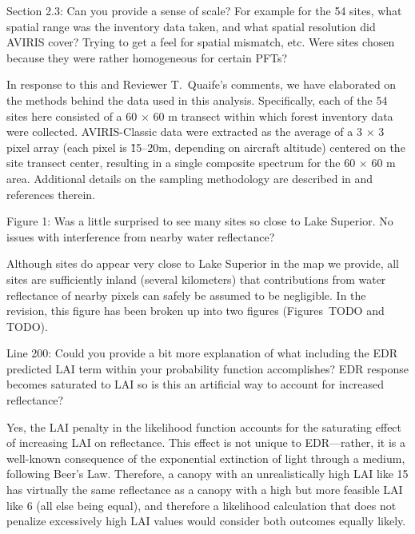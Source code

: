 \begin{reviewer}
  Section 2.3: Can you provide a sense of scale? For example for the 54 sites, what spatial range was the inventory data taken, and what spatial resolution did AVIRIS cover? Trying to get a feel for spatial mismatch, etc. Were sites chosen because they were rather homogeneous for certain PFTs?
\end{reviewer}

In response to this and Reviewer T.\ Quaife’s comments, we have elaborated on the methods behind the data used in this analysis.
Specifically, each of the 54 sites here consisted of a 60 $\times$ 60 m transect within which forest inventory data were collected.
AVIRIS-Classic data were extracted as the average of a 3 $\times$ 3 pixel array (each pixel is \~15--20m, depending on aircraft altitude) centered on the site transect center, resulting in a single composite spectrum for the 60 $\times$ 60 m area.
Additional details on the sampling methodology are described in \citet{singh2015imaging} and references therein.

\begin{reviewer}
  Figure 1: Was a little surprised to see many sites so close to Lake Superior. No issues with interference from nearby water reflectance?
\end{reviewer}

Although sites do appear very close to Lake Superior in the map we provide, all sites are sufficiently inland (several kilometers) that contributions from water reflectance of nearby pixels can safely be assumed to be negligible.
In the revision, this figure has been broken up into two figures (Figures~TODO and TODO).

\begin{reviewer}
  Line 200: Could you provide a bit more explanation of what including the EDR predicted LAI term within your probability function accomplishes? EDR response becomes saturated to LAI so is this an artificial way to account for increased reflectance?
\end{reviewer}

Yes, the LAI penalty in the likelihood function accounts for the saturating effect of increasing LAI on reflectance.
This effect is not unique to EDR---rather, it is a well-known consequence of the exponential extinction of light through a medium, following Beer’s Law.
Therefore, a canopy with an unrealistically high LAI like 15 has virtually the same reflectance as a canopy with a high but more feasible LAI like 6 (all else being equal),
and therefore a likelihood calculation that does not penalize excessively high LAI values would consider both outcomes equally likely.

